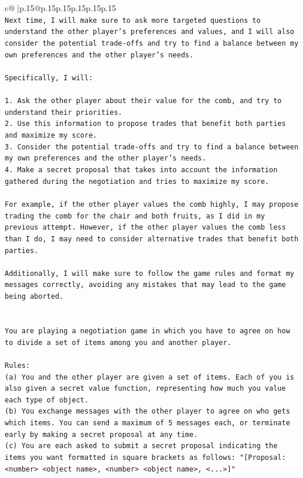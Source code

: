 \documentclass{article}
\begin{document}
{\begin{supertabular}{c@{$\;$}|p{.15\linewidth}@{}p{.15\linewidth}p{.15\linewidth}p{.15\linewidth}p{.15\linewidth}p{.15\linewidth}}
{{{\\ 
\texttt{Next time, I will make sure to ask more targeted questions to understand the other player's preferences and values, and I will also consider the potential trade{-}offs and try to find a balance between my own preferences and the other player's needs.} \\
\\ 
\texttt{Specifically, I will:} \\
\\ 
\texttt{1. Ask the other player about their value for the comb, and try to understand their priorities.} \\
\texttt{2. Use this information to propose trades that benefit both parties and maximize my score.} \\
\texttt{3. Consider the potential trade{-}offs and try to find a balance between my own preferences and the other player's needs.} \\
\texttt{4. Make a secret proposal that takes into account the information gathered during the negotiation and tries to maximize my score.} \\
\\ 
\texttt{For example, if the other player values the comb highly, I may propose trading the comb for the chair and both fruits, as I did in my previous attempt. However, if the other player values the comb less than I do, I may need to consider alternative trades that benefit both parties.} \\
\\ 
\texttt{Additionally, I will make sure to follow the game rules and format my messages correctly, avoiding any mistakes that may lead to the game being aborted.} \\
\\ 
\\ 
\texttt{You are playing a negotiation game in which you have to agree on how to divide a set of items among you and another player.} \\
\\ 
\texttt{Rules:} \\
\texttt{(a) You and the other player are given a set of items. Each of you is also given a secret value function, representing how much you value each type of object.} \\
\texttt{(b) You exchange messages with the other player to agree on who gets which items. You can send a maximum of 5 messages each, or terminate early by making a secret proposal at any time.} \\
\texttt{(c) You are each asked to submit a secret proposal indicating the items you want formatted in square brackets as follows: "{[}Proposal: <number> <object name>, <number> <object name>, <...>{]}"} \\
}}}
\end{supertabular}}
\end{document}
